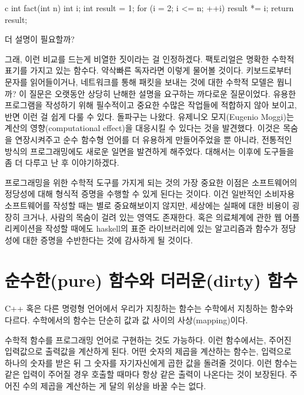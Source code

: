 \begin{snip}{c}
int fact(int n) {
    int i;
    int result = 1;
    for (i = 2; i <= n; ++i)
        result *= i;
    return result;
}
\end{snip}

더 설명이 필요할까?

그래, 이런 비교를 드는게 비열한 짓이라는 걸 인정하겠다. 팩토리얼은 명확한 수학적 표기를 가지고 있는 함수다. 약삭빠른 독자라면 이렇게 물어볼 것이다.
키보드로부터 문자를 읽어들이거나, 네트워크를 통해 패킷을 보내는 것에 대한 수학적 모델은 뭡니까? 이 질문은 오랫동안 상당히 난해한 설명을 요구하는 까다로운 질문이었다.
\trDenotationalSemantics\는 유용한 프로그램을 작성하기 위해 필수적이고 중요한 수많은 작업들에 적합하지 않아 보이고, 반면 \trOperationalSemantics\는 이런 걸 쉽게 다룰 수 있다.
돌파구는  나왔다. 유제니오 모지(Eugenio Moggi)는 계산의 영향(computational effect)을  대응시킬 수 있다는 것을 발견했다.
이것은  목숨을 연장시켜주고 순수 함수형 언어를 더 유용하게 만들어주었을 뿐 아니라, 전통적인 방식의 프로그래밍에도 새로운 일면을 발견하게 해주었다.
 대해서는 이후에  도구들을 좀 더 다루고 난 후 이야기하겠다.

프로그래밍을 위한 수학적 도구를 가지게 되는 것의 가장 중요한 이점은 소프트웨어의 정당성에 대해 형식적 증명을 수행할 수 있게 된다는 것이다.
이건 일반적인 소비자용 소프트웨어를 작성할 때는 별로 중요해보이지 않지만, 세상에는 실패에 대한 비용이 굉장히 크거나, 사람의 목숨이 걸려 있는 영역도 존재한다.
혹은 의료체계에 관한 웹 어플리케이션을 작성할 때에도 haskell의 표준 라이브러리에 있는 알고리즘과 함수가 정당성에 대한 증명을 수반한다는 것에 감사하게 될 것이다.

\section{순수한(pure) 함수와 더러운(dirty) 함수}

C++ 혹은 다른 명령형 언어에서 우리가 지칭하는 함수는 수학에서 지칭하는 함수와 다르다. 수학에서의 함수는 단순히 값과 값 사이의 사상(mapping)이다.

수학적 함수를 프로그래밍 언어로 구현하는 것도 가능하다. 이런 함수에서는, 주어진 입력값으로 출력값을 계산하게 된다.
어떤 숫자의 제곱을 계산하는 함수는, 입력으로 하나의 숫자를 받은 뒤 그 숫자를 자기자신에게 곱한 값을 돌려줄 것이다.
이런 함수는 같은 입력이 주어질 경우 호출할 때마다 항상 같은 출력이 나온다는 것이 보장된다.
주어진 수의 제곱을 계산하는 게 달의 위상을 바꿀 수는 없다.

